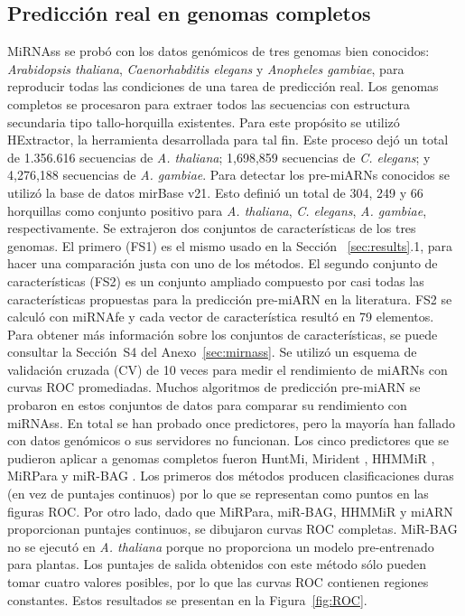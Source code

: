\subsection*{Predicción real en genomas completos} \label{sec:results:genome-wide}

MiRNAss se probó con los datos genómicos de tres genomas bien conocidos: \textit{Arabidopsis thaliana}, \textit{Caenorhabditis elegans} y \textit{Anopheles
gambiae}, para reproducir todas las condiciones de una tarea de predicción real. Los genomas completos se procesaron para extraer todos las secuencias con
estructura secundaria tipo tallo-horquilla existentes. Para este propósito se utilizó HExtractor, la herramienta desarrollada para tal fin. Este proceso
dejó un total de 1.356.616 secuencias de \textit{A. thaliana}; 1,698,859 secuencias de \textit{C. elegans}; y 4,276,188 secuencias de \textit{A. gambiae}.
Para detectar los pre-miARNs conocidos se utilizó la base de datos mirBase v21. Esto definió un total de 304, 249 y 66 horquillas como conjunto positivo para
\textit{A. thaliana}, \textit{C. elegans}, \textit{A. gambiae}, respectivamente.
Se extrajeron dos conjuntos de características de los tres genomas. El primero (FS1) es el mismo usado en la Sección ~\ref{sec:results}.1, para hacer una
comparación justa con uno de los métodos. El segundo conjunto de características (FS2) es un conjunto ampliado compuesto por casi todas las características
propuestas para la predicción pre-miARN en la literatura. FS2 se calculó con miRNAfe y cada vector de característica resultó en 79 elementos. Para obtener más
información sobre los conjuntos de características, se puede consultar la Sección~S4 del Anexo~\ref{sec:mirnass}. Se utilizó un esquema de validación cruzada
(CV) de 10 veces para medir el rendimiento de miARNs con curvas ROC promediadas.
Muchos algoritmos de predicción pre-miARN se probaron en estos conjuntos de datos para comparar su rendimiento con miRNAss. En total se han probado once
predictores, pero la mayoría han fallado con datos genómicos o sus servidores no funcionan. Los cinco predictores que se pudieron aplicar a genomas completos
fueron HuntMi, Mirident \citep{liu2012integrated}, HHMMiR \citep{kadri2009hhmmir}, MiRPara \citep{wu2011mirpara} y miR-BAG \citep{jha2012mirbag}. Los primeros
dos métodos producen clasificaciones duras (en vez de puntajes continuos) por lo que se representan como puntos en las figuras ROC. Por otro lado, dado que
MiRPara, miR-BAG, HHMMiR y miARN proporcionan puntajes continuos, se dibujaron curvas ROC completas. MiR-BAG no se ejecutó en \textit{A. thaliana} porque no
proporciona un modelo pre-entrenado para plantas. Los puntajes de salida obtenidos con este método sólo pueden tomar cuatro valores posibles, por lo que las
curvas ROC contienen regiones constantes. Estos resultados se presentan en la Figura~\ref{fig:ROC}.

